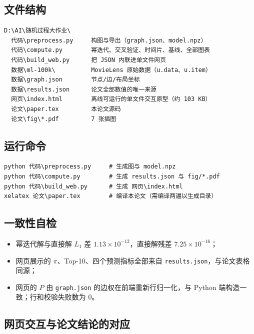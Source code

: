 \documentclass[12pt,a4paper]{ctexart}
\begin{document}
\subsection{文件结构}

\begin{verbatim}
D:\AI\随机过程大作业\
  代码\preprocess.py     构图与导出（graph.json、model.npz）
  代码\compute.py        幂迭代、交叉验证、时间片、基线、全部图表
  代码\build_web.py      把 JSON 内联进单文件网页
  数据\ml-100k\          MovieLens 原始数据（u.data、u.item）
  数据\graph.json        节点/边/布局坐标
  数据\results.json      论文全部数值的唯一来源
  网页\index.html        离线可运行的单文件交互原型（约 103 KB）
  论文\paper.tex         本论文源码
  论文\fig\*.pdf         7 张插图
\end{verbatim}

\subsection{运行命令}

\begin{verbatim}
python 代码\preprocess.py     # 生成图与 model.npz
python 代码\compute.py        # 生成 results.json 与 fig/*.pdf
python 代码\build_web.py      # 生成 网页\index.html
xelatex 论文\paper.tex        # 编译本论文（需编译两遍以生成目录）
\end{verbatim}

\subsection{一致性自检}

\begin{itemize}[leftmargin=1.6em]
\item 幂迭代解与直接解 $L_1$ 差 $1.13\times10^{-12}$，直接解残差 $7.25\times10^{-16}$；
\item 网页展示的 $\pi$、Top-10、四个预测指标全部来自 \texttt{results.json}，与论文表格同源；
\item 网页的 $P$ 由 \texttt{graph.json} 的边权在前端重新行归一化，与 Python 端构造一致；行和校验失败数为 $0$。
\end{itemize}

\subsection{网页交互与论文结论的对应}
\end{document}
